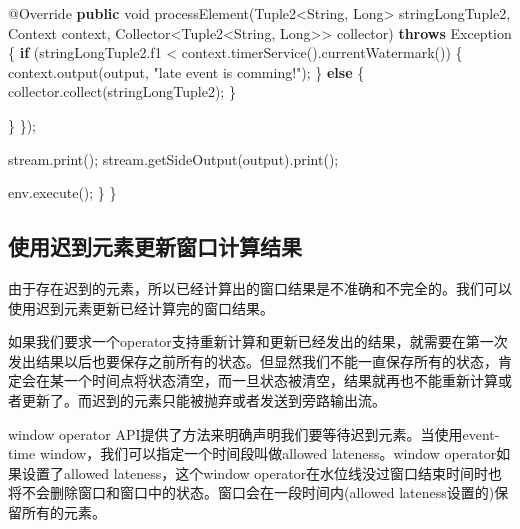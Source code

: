 \documentclass[cn,11pt,chinese]{elegantbook}
\newenvironment{Shaded}{}{}
\newcommand{\AttributeTok}[1]{\textcolor[rgb]{0.49,0.56,0.16}{#1}}
\newcommand{\BuiltInTok}[1]{#1}
\newcommand{\DataTypeTok}[1]{\textcolor[rgb]{0.56,0.13,0.00}{#1}}
\newcommand{\FunctionTok}[1]{\textcolor[rgb]{0.02,0.16,0.49}{#1}}
\newcommand{\KeywordTok}[1]{\textcolor[rgb]{0.00,0.44,0.13}{\textbf{#1}}}
\newcommand{\NormalTok}[1]{#1}
\newcommand{\StringTok}[1]{\textcolor[rgb]{0.25,0.44,0.63}{#1}}
\begin{document}
\begin{Shaded}
\begin{Highlighting}[]
                \AttributeTok{@Override}
                \KeywordTok{public} \DataTypeTok{void} \FunctionTok{processElement}\NormalTok{(Tuple2\textless{}}\BuiltInTok{String}\NormalTok{, }\BuiltInTok{Long}\NormalTok{\textgreater{} stringLongTuple2, }\BuiltInTok{Context}\NormalTok{ context, Collector\textless{}Tuple2\textless{}}\BuiltInTok{String}\NormalTok{, }\BuiltInTok{Long}\NormalTok{\textgreater{}\textgreater{} collector) }\KeywordTok{throws} \BuiltInTok{Exception}\NormalTok{ \{}
                    \KeywordTok{if}\NormalTok{ (stringLongTuple2.}\FunctionTok{f1}\NormalTok{ \textless{} context.}\FunctionTok{timerService}\NormalTok{().}\FunctionTok{currentWatermark}\NormalTok{()) \{}
\NormalTok{                        context.}\FunctionTok{output}\NormalTok{(output, }\StringTok{"late event is comming!"}\NormalTok{);}
\NormalTok{                    \} }\KeywordTok{else}\NormalTok{ \{}
\NormalTok{                        collector.}\FunctionTok{collect}\NormalTok{(stringLongTuple2);}
\NormalTok{                    \}}

\NormalTok{                \}}
\NormalTok{            \});}

\NormalTok{        stream.}\FunctionTok{print}\NormalTok{();}
\NormalTok{        stream.}\FunctionTok{getSideOutput}\NormalTok{(output).}\FunctionTok{print}\NormalTok{();}

\NormalTok{        env.}\FunctionTok{execute}\NormalTok{();}
\NormalTok{    \}}
\NormalTok{\}}
\end{Highlighting}
\end{Shaded}

\hypertarget{ux4f7fux7528ux8fdfux5230ux5143ux7d20ux66f4ux65b0ux7a97ux53e3ux8ba1ux7b97ux7ed3ux679c}{%
\subsection{使用迟到元素更新窗口计算结果}\label{ux4f7fux7528ux8fdfux5230ux5143ux7d20ux66f4ux65b0ux7a97ux53e3ux8ba1ux7b97ux7ed3ux679c}}

由于存在迟到的元素，所以已经计算出的窗口结果是不准确和不完全的。我们可以使用迟到元素更新已经计算完的窗口结果。

如果我们要求一个operator支持重新计算和更新已经发出的结果，就需要在第一次发出结果以后也要保存之前所有的状态。但显然我们不能一直保存所有的状态，肯定会在某一个时间点将状态清空，而一旦状态被清空，结果就再也不能重新计算或者更新了。而迟到的元素只能被抛弃或者发送到旁路输出流。

window operator
API提供了方法来明确声明我们要等待迟到元素。当使用event-time
window，我们可以指定一个时间段叫做allowed lateness。window
operator如果设置了allowed lateness，这个window
operator在水位线没过窗口结束时间时也将不会删除窗口和窗口中的状态。窗口会在一段时间内(allowed
lateness设置的)保留所有的元素。
\end{document}
